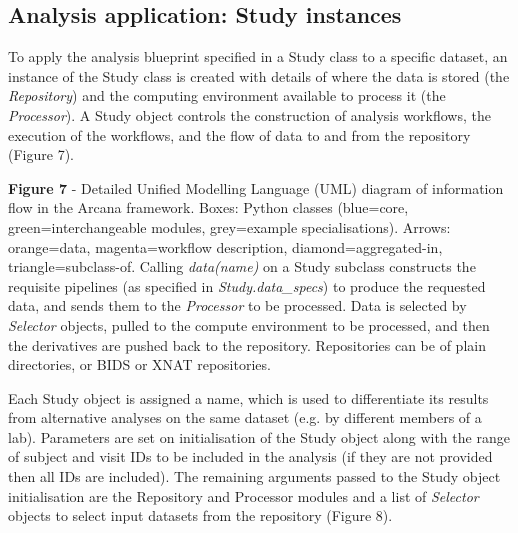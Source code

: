 \hypertarget{analysis-application-study-instances}{%
\subsection{Analysis application: Study
instances}\label{analysis-application-study-instances}}

To apply the analysis blueprint specified in a Study class to a specific
dataset, an instance of the Study class is created with details of where
the data is stored (the \emph{Repository}) and the computing environment
available to process it (the \emph{Processor}). A Study object controls
the construction of analysis workflows, the execution of the workflows,
and the flow of data to and from the repository (Figure 7).


\textbf{Figure 7} - Detailed Unified Modelling Language (UML) diagram of
information flow in the Arcana framework. Boxes: Python classes
(blue=core, green=interchangeable modules, grey=example
specialisations). Arrows: orange=data, magenta=workflow description,
diamond=aggregated-in, triangle=subclass-of. Calling \emph{data(name)}
on a Study subclass constructs the requisite pipelines (as specified in
\emph{Study.data\_specs}) to produce the requested data, and sends them
to the \emph{Processor} to be processed. Data is selected by
\emph{Selector} objects, pulled to the compute environment to be
processed, and then the derivatives are pushed back to the repository.
Repositories can be of plain directories, or BIDS or XNAT repositories.

Each Study object is assigned a name, which is used to differentiate its
results from alternative analyses on the same dataset (e.g. by different
members of a lab). Parameters are set on initialisation of the Study
object along with the range of subject and visit IDs to be included in
the analysis (if they are not provided then all IDs are included). The
remaining arguments passed to the Study object initialisation are the
Repository and Processor modules and a list of \emph{Selector} objects
to select input datasets from the repository (Figure 8).


